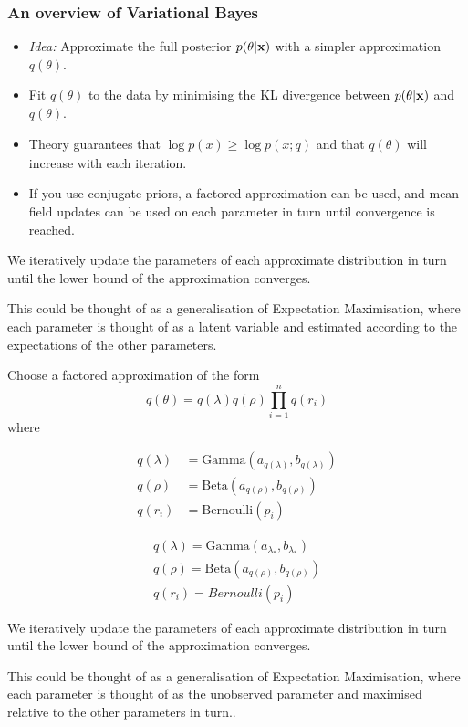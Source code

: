 \documentclass{beamer}
\begin{document}
\begin{frame}
\frametitle{An overview of Variational Bayes}
\begin{itemize}
\item \emph{Idea:} Approximate the full posterior $p(\theta|\bf x)$ with a simpler approximation $q(\theta)$.

\item Fit $q(\theta)$ to the data by minimising the KL divergence between $p(\theta|\bf x)$ and $q(\theta)$.

\item Theory guarantees that $\log p(x)\ge 
\log \underline{p}(x;q)$ and that $q(\theta)$ will
increase with each iteration.

\item If you use conjugate priors, a factored approximation can be used, and mean field updates can be used on
each parameter in turn until convergence is reached.
\end{itemize}

We iteratively update the parameters of each approximate distribution
in turn until the lower bound of the approximation converges.

This could be thought of as a generalisation of Expectation Maximisation, where each parameter is thought of as a latent
variable and estimated according to the expectations of the other parameters.
\end{frame}




\begin{frame}
Choose a factored approximation of the form
$$
q(\theta) = q(\lambda) q(\rho) \prod_{i=1}^n q(r_i)
$$
where

\begin{align*}
q(\lambda) &= \text{Gamma}(a_{q(\lambda)}, b_{q(\lambda)}) \\
q(\rho) &= \text{Beta}(a_{q(\rho)}, b_{q(\rho)}) \\
q(r_i) &= \text{Bernoulli}(p_i)
\end{align*}

\begin{align*}
q(\lambda) = \text{Gamma}(a_{\lambda_*}, b_{\lambda_*}) \\
q(\rho) = \text{Beta}(a_{q(\rho)}, b_{q(\rho)}) \\
q(r_i) = Bernoulli(p_i)
\end{align*}

We iteratively update the parameters of each approximate distribution
in turn until the lower bound of the approximation converges.

This could be thought of as a generalisation of Expectation Maximisation,
where each parameter is thought of as the unobserved parameter and maximised
relative to the other parameters in turn..
\end{frame}
 
\end{document}
